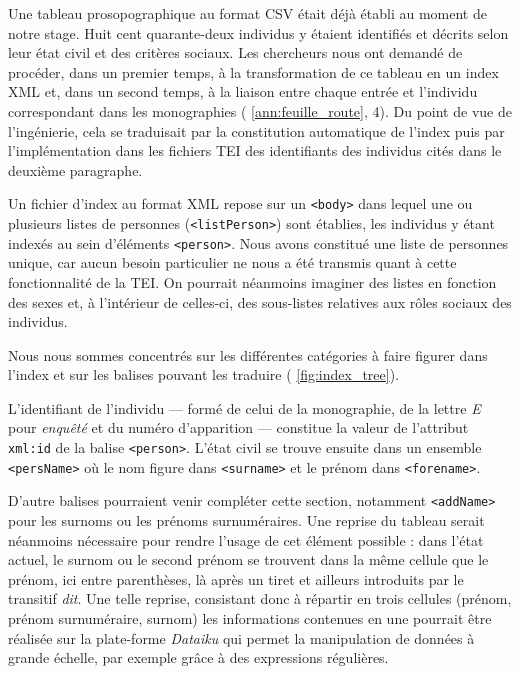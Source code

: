Une tableau prosopographique au format CSV était déjà établi au moment de notre stage. Huit cent quarante-deux individus y étaient identifiés et décrits selon leur état civil et des critères sociaux. Les chercheurs nous ont demandé de procéder, dans un premier temps, à la transformation de ce tableau en un  index XML et, dans un second temps, à la liaison entre chaque entrée et l'individu correspondant dans les monographies (\ann{} \ref{ann:feuille_route}, \issue{} 4). Du point de vue de l'ingénierie, cela se traduisait par la constitution automatique de l'index puis par l'implémentation dans les fichiers TEI des identifiants des individus cités dans le deuxième paragraphe.

Un fichier d'index au format XML repose sur un \texttt{<body>} dans lequel une ou plusieurs listes de personnes (\texttt{<listPerson>}) sont établies, les individus y étant indexés au sein d'éléments \texttt{<person>}. Nous avons constitué une liste de personnes unique, car aucun besoin particulier ne nous a été transmis quant à cette fonctionnalité de la TEI. On pourrait néanmoins imaginer des listes en fonction des sexes et, à l'intérieur de celles-ci, des sous-listes relatives aux rôles sociaux des individus. 

Nous nous sommes concentrés sur les différentes catégories à faire figurer dans l'index et sur les balises pouvant les traduire (\fig{} \ref{fig:index_tree}).

L'identifiant de l'individu --- formé de celui de la monographie, de la lettre \textit{E} pour \textit{enquêté} et du numéro d'apparition --- constitue la valeur de l'attribut \texttt{xml:id} de la balise \texttt{<person>}. L'état civil se trouve ensuite dans un ensemble \texttt{<persName>} où le nom figure dans \texttt{<surname>} et le prénom dans \texttt{<forename>}.

D'autre balises pourraient venir compléter cette section, notamment \texttt{<addName>} pour les surnoms ou les prénoms surnuméraires. Une reprise du tableau serait néanmoins nécessaire pour rendre l'usage de cet élément possible : dans l'état actuel, le surnom ou le second prénom se trouvent dans la même cellule que le prénom, ici entre parenthèses, là après un tiret et ailleurs introduits par le transitif \textit{dit}. Une telle reprise, consistant donc à répartir en trois cellules (prénom, prénom surnuméraire, surnom) les informations contenues en une pourrait être réalisée sur la plate-forme \textit{Dataiku} qui permet la manipulation de données à grande échelle, par exemple grâce à des expressions régulières.

